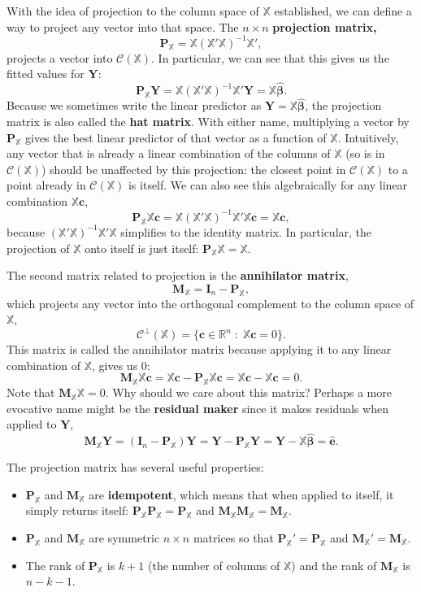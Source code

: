 \documentclass[
  letterpaper,
  DIV=11,
  numbers=noendperiod]{scrreprt}
\newcommand{\mb}{\symbf}
\newcommand{\Xmat}{\mathbb{X}}
\newcommand{\bhat}{\widehat{\mb{\beta}}}
\theoremstyle{plain}
\theoremstyle{definition}
\theoremstyle{definition}
\theoremstyle{remark}
\begin{document}
With the idea of projection to the column space of \(\Xmat\)
established, we can define a way to project any vector into that space.
The \(n\times n\) \textbf{projection matrix,} \[
\mb{P}_{\Xmat} = \Xmat (\Xmat'\Xmat)^{-1} \Xmat',
\] projects a vector into \(\mathcal{C}(\Xmat)\). In particular, we can
see that this gives us the fitted values for \(\mb{Y}\): \[ 
\mb{P}_{\Xmat}\mb{Y} = \Xmat (\Xmat'\Xmat)^{-1} \Xmat'\mb{Y} = \Xmat\bhat.
\] Because we sometimes write the linear predictor as
\(\widehat{\mb{Y}} = \Xmat\bhat\), the projection matrix is also called
the \textbf{hat matrix}. With either name, multiplying a vector by
\(\mb{P}_{\Xmat}\) gives the best linear predictor of that vector as a
function of \(\Xmat\). Intuitively, any vector that is already a linear
combination of the columns of \(\Xmat\) (so is in
\(\mathcal{C}(\Xmat)\)) should be unaffected by this projection: the
closest point in \(\mathcal{C}(\Xmat)\) to a point already in
\(\mathcal{C}(\Xmat)\) is itself. We can also see this algebraically for
any linear combination \(\Xmat\mb{c}\), \[
\mb{P}_{\Xmat}\Xmat\mb{c} = \Xmat (\Xmat'\Xmat)^{-1} \Xmat'\Xmat\mb{c} = \Xmat\mb{c},
\] because \((\Xmat'\Xmat)^{-1} \Xmat'\Xmat\) simplifies to the identity
matrix. In particular, the projection of \(\Xmat\) onto itself is just
itself: \(\mb{P}_{\Xmat}\Xmat = \Xmat\).

The second matrix related to projection is the \textbf{annihilator
matrix}, \[ 
\mb{M}_{\Xmat} = \mb{I}_{n} - \mb{P}_{\Xmat},
\] which projects any vector into the orthogonal complement to the
column space of \(\Xmat\), \[
\mathcal{C}^{\perp}(\Xmat) = \{\mb{c} \in \mathbb{R}^n\;:\; \Xmat\mb{c} = 0 \}.
\] This matrix is called the annihilator matrix because applying it to
any linear combination of \(\Xmat\), gives us 0: \[ 
\mb{M}_{\Xmat}\Xmat\mb{c} = \Xmat\mb{c} - \mb{P}_{\Xmat}\Xmat\mb{c} = \Xmat\mb{c} - \Xmat\mb{c} = 0.
\] Note that \(\mb{M}_{\Xmat}\Xmat = 0\). Why should we care about this
matrix? Perhaps a more evocative name might be the \textbf{residual
maker} since it makes residuals when applied to \(\mb{Y}\), \[ 
\mb{M}_{\Xmat}\mb{Y} = (\mb{I}_{n} - \mb{P}_{\Xmat})\mb{Y} = \mb{Y} - \mb{P}_{\Xmat}\mb{Y} = \mb{Y} - \Xmat\bhat = \widehat{\mb{e}}.
\]

The projection matrix has several useful properties:

\begin{itemize}
\item
  \(\mb{P}_{\Xmat}\) and \(\mb{M}_{\Xmat}\) are \textbf{idempotent},
  which means that when applied to itself, it simply returns itself:
  \(\mb{P}_{\Xmat}\mb{P}_{\Xmat} = \mb{P}_{\Xmat}\) and
  \(\mb{M}_{\Xmat}\mb{M}_{\Xmat} = \mb{M}_{\Xmat}\).
\item
  \(\mb{P}_{\Xmat}\) and \(\mb{M}_{\Xmat}\) are symmetric \(n \times n\)
  matrices so that \(\mb{P}_{\Xmat}' = \mb{P}_{\Xmat}\) and
  \(\mb{M}_{\Xmat}' = \mb{M}_{\Xmat}\).
\item
  The rank of \(\mb{P}_{\Xmat}\) is \(k+1\) (the number of columns of
  \(\Xmat\)) and the rank of \(\mb{M}_{\Xmat}\) is \(n - k - 1\).
\end{itemize}
\end{document}
